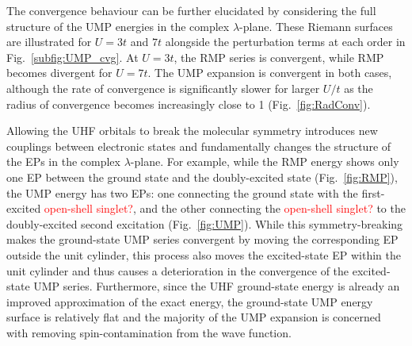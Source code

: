 \documentclass[aps,prb,reprint,noshowkeys,linenumbers,superscriptaddress]{revtex4-1}
\newcommand{\titou}[1]{\textcolor{red}{#1}}
\begin{document}
The convergence behaviour can be further elucidated by considering the full structure of the UMP energies 
in the complex $\lambda$-plane.
These Riemann surfaces are illustrated for $U = 3t$ and $7t$ alongside the perturbation terms at each order
in Fig.~\ref{subfig:UMP_cvg}.
At $U = 3t$, the RMP series is convergent, while RMP becomes divergent for $U=7t$.
The UMP expansion is convergent in both cases, although the rate of convergence is significantly slower 
for larger $U/t$ as the radius of convergence becomes increasingly close to 1 (Fig.~\ref{fig:RadConv}).

Allowing the UHF orbitals to break the molecular symmetry introduces new couplings between electronic states
and fundamentally changes the structure of the EPs in the complex $\lambda$-plane.
For example, while the RMP energy shows only one EP between the ground state and 
the doubly-excited state (Fig.~\ref{fig:RMP}), the UMP energy has two EPs: one connecting the ground state with the
first-excited \titou{open-shell singlet?}, and the other connecting the \titou{open-shell singlet?} to the 
doubly-excited second excitation (Fig.~\ref{fig:UMP}).
While this symmetry-breaking makes the ground-state UMP series convergent by moving the corresponding
EP outside the unit cylinder, this process also moves the excited-state EP within the unit cylinder
and thus causes a deterioration in the convergence of the excited-state UMP series.
Furthermore, since the UHF ground-state energy is already an improved approximation of the exact energy, the ground-state
UMP energy surface is relatively flat and the majority of the UMP expansion is concerned with removing 
spin-contamination from the wave function.
\end{document}
